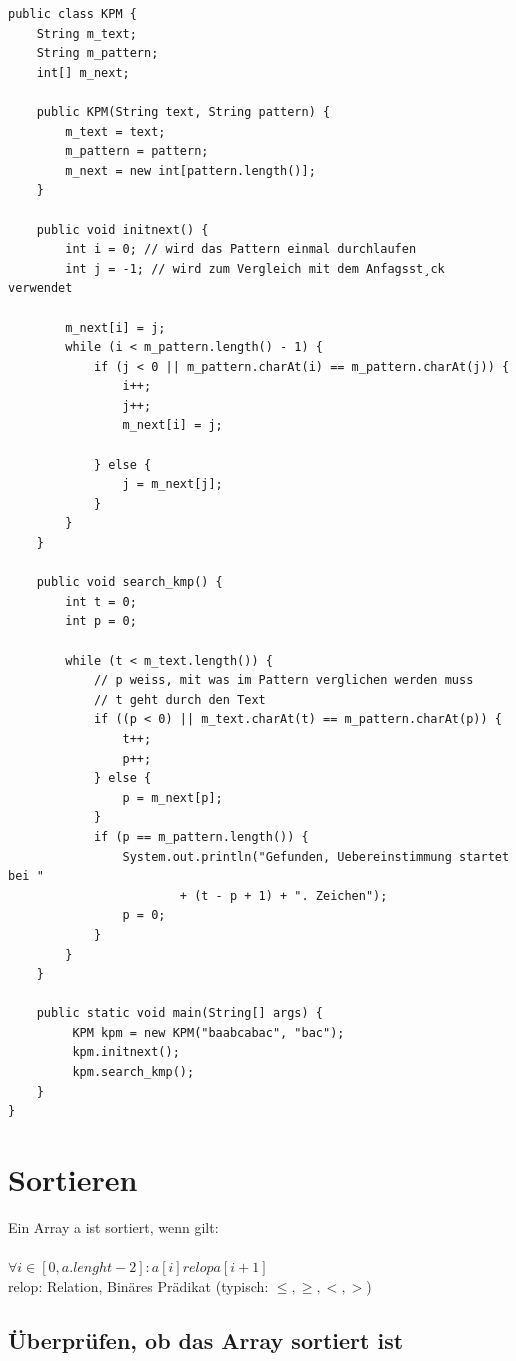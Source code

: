 \documentclass[a4paper,10pt]{article}
\begin{document}
\begin{lstlisting}
public class KPM {
    String m_text;
    String m_pattern;
    int[] m_next;

    public KPM(String text, String pattern) {
        m_text = text;
        m_pattern = pattern;
        m_next = new int[pattern.length()];
    }
    
    public void initnext() {
        int i = 0; // wird das Pattern einmal durchlaufen
        int j = -1; // wird zum Vergleich mit dem Anfagsst¸ck verwendet

        m_next[i] = j;
        while (i < m_pattern.length() - 1) {
            if (j < 0 || m_pattern.charAt(i) == m_pattern.charAt(j)) {
                i++;
                j++;
                m_next[i] = j;

            } else {
                j = m_next[j];
            }
        }
    }

    public void search_kmp() {
        int t = 0;
        int p = 0;

        while (t < m_text.length()) {
            // p weiss, mit was im Pattern verglichen werden muss
            // t geht durch den Text
            if ((p < 0) || m_text.charAt(t) == m_pattern.charAt(p)) {
                t++;
                p++;
            } else {
                p = m_next[p];
            }
            if (p == m_pattern.length()) {
                System.out.println("Gefunden, Uebereinstimmung startet bei "
                        + (t - p + 1) + ". Zeichen");
                p = 0;
            }
        }
    }   
    
    public static void main(String[] args) {
         KPM kpm = new KPM("baabcabac", "bac");
         kpm.initnext();
         kpm.search_kmp();
    }
}
\end{lstlisting}

\newpage
\section{Sortieren}
Ein Array a ist sortiert, wenn gilt: \\ \\
$ \forall i \in [0, a.lenght-2] : a[i] relop a[i+1]$ \\
relop: Relation, Bin\"ares Pr\"adikat (typisch: $\leq,\geq,<,>$)

\subsection{\"Uberpr\"ufen, ob das Array sortiert ist}
\end{document}
